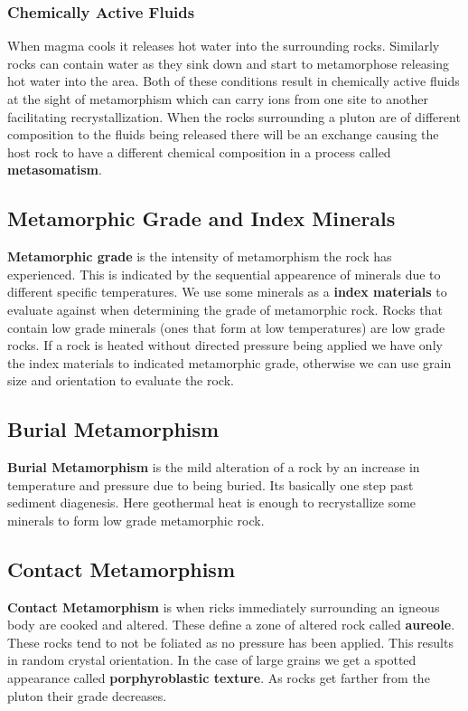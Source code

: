 \documentclass{article}
\begin{document}
\subsubsection{Chemically Active Fluids} %
\label{sub:chemically_active_fluids}
When magma cools it releases hot water into the surrounding rocks. Similarly rocks can contain water as they sink down and start to metamorphose releasing hot water into the area. Both of these conditions result in chemically active fluids at the sight of metamorphism which can carry ions from one site to another facilitating recrystallization. When the rocks surrounding a pluton are of different composition to the fluids being released there will be an exchange causing the host rock to have a different chemical composition in a process called \textbf{metasomatism}.


\subsection{Metamorphic Grade and Index Minerals} %
\label{sub:metamorphic_grade_and_index_minerals}
\textbf{Metamorphic grade} is the intensity of metamorphism the rock has experienced. This is indicated by the sequential appearence of minerals due to different specific temperatures. We use some minerals as a \textbf{index materials} to evaluate against when determining the grade of metamorphic rock. Rocks that contain low grade minerals (ones that form at low temperatures) are low grade rocks. If a rock is heated without directed pressure being applied we have only the index materials to indicated metamorphic grade, otherwise we can use grain size and orientation to evaluate the rock.

\subsection{Burial Metamorphism} %
\label{sub:burial_metamorphism}
\textbf{Burial Metamorphism} is the mild alteration of a rock by an increase in temperature and pressure due to being buried. Its basically one step past sediment diagenesis. Here geothermal heat is enough to recrystallize some minerals to form low grade metamorphic rock.

\subsection{Contact Metamorphism} %
\label{sub:contact_metamorphism}
\textbf{Contact Metamorphism} is when ricks immediately surrounding an igneous body are cooked and altered. These define a zone of altered rock called \textbf{aureole}. These rocks tend to not be foliated as no pressure has been applied. This results in random crystal orientation. In the case of large grains we get a spotted appearance called \textbf{porphyroblastic texture}. As rocks get farther from the pluton their grade decreases.
\end{document}
